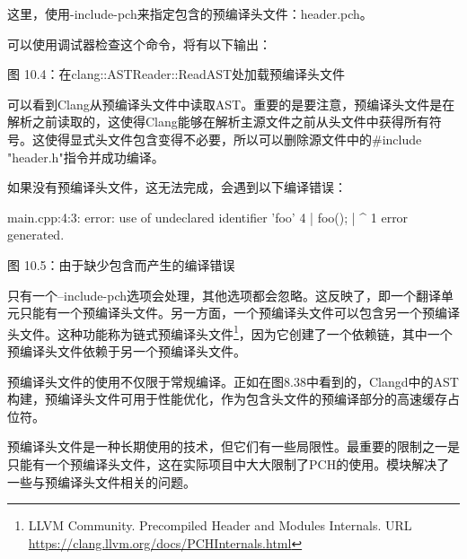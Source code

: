 这里，使用-include-pch来指定包含的预编译头文件：header.pch。

可以使用调试器检查这个命令，将有以下输出：


\begin{center}
图 10.4：在clang::ASTReader::ReadAST处加载预编译头文件
\end{center}

可以看到Clang从预编译头文件中读取AST。重要的是要注意，预编译头文件是在解析之前读取的，这使得Clang能够在解析主源文件之前从头文件中获得所有符号。这使得显式头文件包含变得不必要，所以可以删除源文件中的\#include "header.h"指令并成功编译。

如果没有预编译头文件，这无法完成，会遇到以下编译错误：

\begin{shell}
main.cpp:4:3: error: use of undeclared identifier 'foo'
   4 |   foo();
     |   ^
1  error generated.
\end{shell}

\begin{center}
图 10.5：由于缺少包含而产生的编译错误
\end{center}

只有一个–include-pch选项会处理，其他选项都会忽略。这反映了，即一个翻译单元只能有一个预编译头文件。另一方面，一个预编译头文件可以包含另一个预编译头文件。这种功能称为链式预编译头文件\footnote{LLVM Community. Precompiled Header and Modules Internals. URL \url{https://clang.llvm.org/docs/PCHInternals.html}}，因为它创建了一个依赖链，其中一个预编译头文件依赖于另一个预编译头文件。

预编译头文件的使用不仅限于常规编译。正如在图8.38中看到的，Clangd中的AST构建，预编译头文件可用于性能优化，作为包含头文件的预编译部分的高速缓存占位符。

预编译头文件是一种长期使用的技术，但它们有一些局限性。最重要的限制之一是只能有一个预编译头文件，这在实际项目中大大限制了PCH的使用。模块解决了一些与预编译头文件相关的问题。
